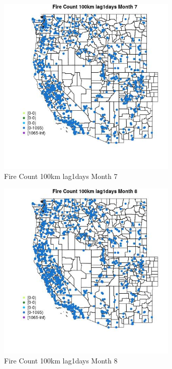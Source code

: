 \begin{figure} 
\centering  
\includegraphics[width=0.77\textwidth]{Code_Outputs/Report_ML_input_PM25_Step4_part_f_de_duplicated_aveswNAs_MapObsMo7Fire_Count_100km_lag1days.jpg} 
\caption{\label{fig:Report_ML_input_PM25_Step4_part_f_de_duplicated_aveswNAsMapObsMo7Fire_Count_100km_lag1days}Fire Count 100km lag1days Month 7} 
\end{figure} 
 

\begin{figure} 
\centering  
\includegraphics[width=0.77\textwidth]{Code_Outputs/Report_ML_input_PM25_Step4_part_f_de_duplicated_aveswNAs_MapObsMo8Fire_Count_100km_lag1days.jpg} 
\caption{\label{fig:Report_ML_input_PM25_Step4_part_f_de_duplicated_aveswNAsMapObsMo8Fire_Count_100km_lag1days}Fire Count 100km lag1days Month 8} 
\end{figure} 
 

